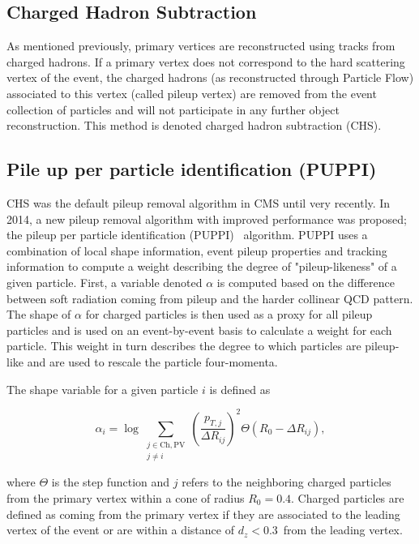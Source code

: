 \subsection{Charged Hadron Subtraction}
\label{subsub:objreco:chs}
As mentioned previously, primary vertices are reconstructed using tracks from charged hadrons. If a primary vertex does not correspond to the hard scattering vertex of the event, the charged hadrons (as reconstructed through Particle Flow) associated to this vertex (called pileup vertex) are removed from the event collection of particles and will not participate in any further object reconstruction. This method is denoted charged hadron subtraction (CHS).

\subsection{Pile up per particle identification (PUPPI)}
\label{subsub:objreco:puppi}
CHS was the default pileup removal algorithm in CMS until very recently. In 2014, a new pileup removal algorithm with improved performance was proposed; the pileup per particle identification (PUPPI)~\cite{Bertolini2014} algorithm.
PUPPI uses a combination of local shape information, event pileup properties and tracking information to compute a weight describing the degree of "pileup-likeness" of a given particle.
First, a variable denoted $\alpha$ is computed based on the difference between soft radiation coming from pileup and the harder collinear QCD pattern. The shape of $\alpha$ for charged particles is then used as a proxy for all pileup particles and is used on an event-by-event basis to calculate a weight for each particle. This weight in turn describes the degree to which particles are pileup-like and are used to rescale the particle four-momenta.

The shape variable for a given particle $i$ is defined as

\begin{equation}
  \alpha_i = \log \sum_{\substack{j \in \mathrm{Ch,PV} \\ j \neq i}} \left(\frac{p_{T,j}}{\Delta R_{ij}}\right)^{2} \Theta(R_0 - \Delta R_{ij}),
\end{equation}

where $\Theta$ is the step function and $j$ refers to the neighboring charged particles from the primary vertex within a cone of radius $R_0=0.4$. Charged particles are defined as coming from the primary vertex if they are associated to the leading vertex of the event or are within a distance of $d_z < $0.3~\cm from the leading vertex. 

